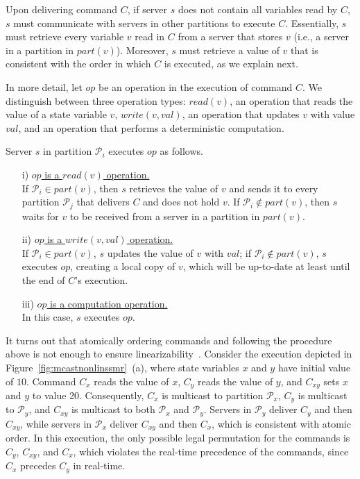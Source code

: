 \documentclass[11pt]{article}
\newcommand{\ppm}{\mathcal{P}}
\begin{document}
Upon delivering command $C$, if server $s$ does not contain all variables read by $C$, $s$ must communicate with servers in other partitions to execute $C$.
Essentially, $s$ must retrieve every variable $v$ read in $C$ from a server that stores $v$ (i.e., a server in a partition in $part(v)$).
Moreover, $s$ must retrieve a value of $v$ that is consistent with the order in which $C$ is executed, as we explain next.

In more detail, let $op$ be an operation in the execution of command $C$.
We distinguish between three operation types: $read(v)$, an operation that reads the value of a state variable $v$, $write(v, val)$, an operation that updates $v$ with value $val$,
and an operation that performs a deterministic computation.

Server $s$ in partition $\ppm_i$ executes $op$ as follows.

\begin{itemize}

\item[i)] \underline{$op$ is a $read(v)$ operation.} \\
If $\ppm_i \in part(v)$, then $s$ retrieves the value of $v$ and sends it to every partition $\ppm_j$ that delivers $C$ and does not hold $v$. If $\ppm_i \not\in part(v)$, then $s$ waits for $v$ to be received from a server in a partition in $part(v)$.

\item[ii)] \underline{$op$ is a $write(v,val)$ operation.} \\
If $\ppm_i \in part(v)$, $s$ updates the value of $v$ with $val$; if $\ppm_i \not\in part(v)$, $s$ executes $op$, creating a local copy of $v$, which will be up-to-date at least until the end of $C$'s execution.

\item[iii)] \underline{$op$ is a computation operation.}\\
In this case, $s$ executes $op$.

\end{itemize}

It turns out that atomically ordering commands and following the procedure above is not enough to ensure linearizability~\cite{bezerra2014ssmr}.
Consider the execution depicted in Figure~\ref{fig:mcastnonlinssmr}~(a), where state variables $x$ and $y$ have initial value of $10$.
Command $C_x$ reads the value of $x$, $C_y$ reads the value of $y$, and $C_{xy}$ sets $x$ and $y$ to value 20.
Consequently, $C_x$ is multicast to partition $\ppm_x$, $C_y$ is multicast to $\ppm_y$, and $C_{xy}$ is multicast to both $\ppm_x$ and $\ppm_y$.
Servers in $\ppm_y$ deliver $C_y$ and then $C_{xy}$, while servers in $\ppm_x$ deliver $C_{xy}$ and then $C_x$, which is consistent with atomic order.
In this execution, the only possible legal permutation for the commands is $C_y$, $C_{xy}$, and $C_x$, which violates the real-time precedence of the commands, since $C_x$ precedes $C_y$ in real-time.
\end{document}
